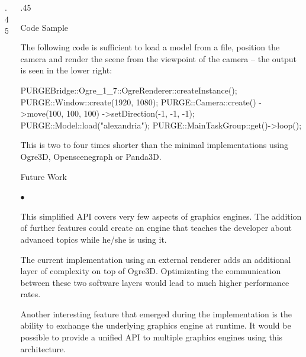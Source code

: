 \documentclass[final,hyperref={pdfpagelabels=true}]{beamer}
\newenvironment{smalllist}{\begin{list}{$\bullet$}{\itemsep 0cm \parskip 0pt}}{\end{list}}
\begin{document}
\begin{frame}[fragile]
\begin{columns}[t]
\begin{column}{.45\textwidth}
		\end{column}

		\begin{column}{.45\textwidth}

			\begin{block}{Code Sample}

				The following code is sufficient to load a model from a file, position the camera and render the scene from the viewpoint of the camera -- the output is seen in the lower right:

				\begin{code}[0]
					PURGEBridge::Ogre_1_7::OgreRenderer::createInstance();
					PURGE::Window::create(1920, 1080);
					PURGE::Camera::create()
					    ->move(100, 100, 100)
					    ->setDirection(-1, -1, -1);
					PURGE::Model::load("alexandria");
					PURGE::MainTaskGroup::get()->loop();
				\end{code}

				This is two to four times shorter than the minimal implementations using Ogre3D, Openscenegraph or Panda3D.

			\end{block}

			\begin{block}{Future Work}
				\begin{smalllist}
					\item This simplified API covers very few aspects of graphics engines. The addition of further features could create an engine that teaches the developer about advanced topics while he/she is using it.
					\item The current implementation using an external renderer adds an additional layer of complexity on top of Ogre3D. Optimizating the communication between these two software layers would lead to much higher performance rates.
					\item Another interesting feature that emerged during the implementation is the ability to exchange the underlying graphics engine at runtime. It would be possible to provide a unified API to multiple graphics engines using this architecture.
				\end{smalllist}
			\end{block}



\end{column}
\end{columns}
\end{frame}
\end{document}
